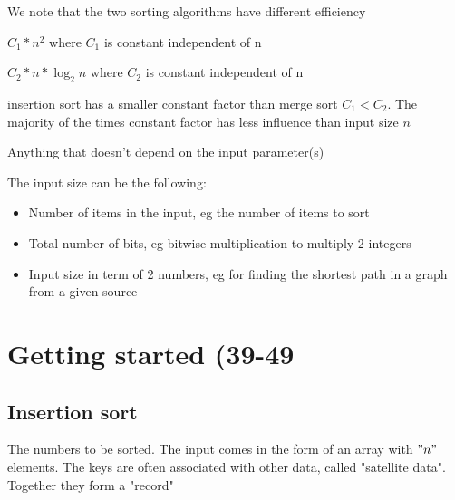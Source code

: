 \begin{eg}\label{eg:insertion_sort_vs_merge_sort_1}
  We note that the two sorting algorithms have different efficiency
  \begin{note}\label{note:insertion_sort_1}
    $C_1*n^2$ where $C_1$ is constant independent of n
  \end{note}

  \begin{note}\label{note:merge_sort_1}
    $C_2 * n * \log_{2}n$ where $C_2$ is constant independent of n
  \end{note}

  \begin{remark}\label{def:constant_factor_1}
    insertion sort has a smaller constant factor than merge sort $C_1 < C_2$. The majority of the times constant factor has less influence than input size $n$
  \end{remark}

  \begin{definition}\label{def:constant_factor_2}
      Anything that doesn't depend on the input parameter(s)
  \end{definition}

  \begin{definition}\label{def:constant_factor_2}
      The input size can be the following:

      \begin{itemize}
          \item Number of items in the input, eg the number of items to sort
          \item Total number of bits, eg bitwise multiplication to multiply 2 integers
          \item Input size in term of 2 numbers, eg for finding the shortest path in a graph from a given source
      \end{itemize}
  \end{definition}

  \end{eg}

  \chapter{Getting started (39-49}

  \section{Insertion sort}
  \begin{definition}[keys]\label{def:keys_1}
      The numbers to be sorted. The input comes in the form of an array with $"n"$ elements. The keys are often associated with other data, called "satellite data". Together they form a "record" 
  \end{definition}


